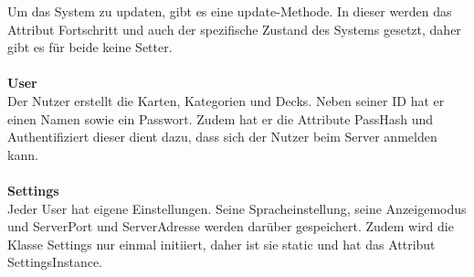 \documentclass[fontsize=12pt,paper=a4,twoside]{scrartcl}
\begin{document}
Um das System zu updaten, gibt es eine update-Methode. In dieser werden das Attribut Fortschritt und auch der spezifische Zustand des Systems gesetzt, daher gibt es für beide keine Setter.
\\
\\
\textbf{User}\\ 
Der Nutzer erstellt die Karten, Kategorien und Decks. Neben seiner ID hat er einen Namen sowie ein Passwort. Zudem hat er die Attribute PassHash und Authentifiziert 
dieser dient dazu, dass sich der Nutzer beim Server anmelden kann. 
\\
\\
\textbf{Settings}\\
Jeder User hat eigene Einstellungen. Seine Spracheinstellung, seine Anzeigemodus und ServerPort und ServerAdresse werden darüber gespeichert.
Zudem wird die Klasse Settings nur einmal initiiert, daher ist sie static und hat das Attribut SettingsInstance.
\end{document}

